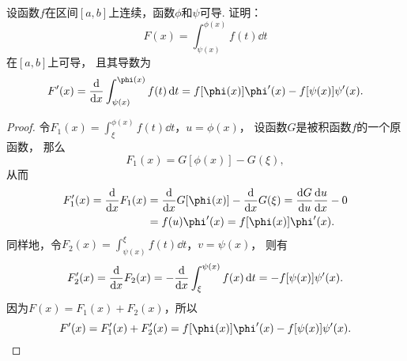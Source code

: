 \begin{example}
设函数\(f\)在区间\([a,b]\)上连续，函数\(\phi\)和\(\psi\)可导.
证明：\begin{equation*}
	F(x) = \int_{\psi(x)}^{\phi(x)} f(t) \dd{t}
\end{equation*}在\([a,b]\)上可导，
且其导数为\begin{equation}\label{equation:定积分.含参变量积分的导数1}
	F'(x) = \dv{x} \int_{\psi(x)}^{\phi(x)} f(t) \dd{t}
	= f[\phi(x)] \phi'(x) - f[\psi(x)] \psi'(x).
\end{equation}
\begin{proof}
令\(F_1(x) = \int_{\xi}^{\phi(x)} f(t) \dd{t}\)，\(u = \phi(x)\)，
设函数\(G\)是被积函数\(f\)的一个原函数，
那么\begin{equation*}
	F_1(x) = G[\phi(x)] - G(\xi),
\end{equation*}
从而\begin{align*}
	F'_1(x) = \dv{x} F_1(x)
	&= \dv{x} G[\phi(x)] - \dv{x} G(\xi) = \dv{G}{u} \dv{u}{x} - 0 \\
	&= f(u) \phi'(x) = f[\phi(x)] \phi'(x).
\end{align*}
同样地，令\(F_2(x) = \int_{\psi(x)}^{\xi} f(t) \dd{t}\)，\(v = \psi(x)\)，
则有\begin{equation*}
	F'_2(x) = \dv{x} F_2(x) = -\dv{x} \int_{\xi}^{\psi(x)} f(x) \dd{t}
	= -f[\psi(x)] \psi'(x).
\end{equation*}
因为\(F(x) = F_1(x) + F_2(x)\)，所以\begin{equation*}
	F'(x) = F'_1(x) + F'_2(x)
	= f[\phi(x)] \phi'(x) - f[\psi(x)] \psi'(x).
	\qedhere
\end{equation*}
\end{proof}
\end{example}

